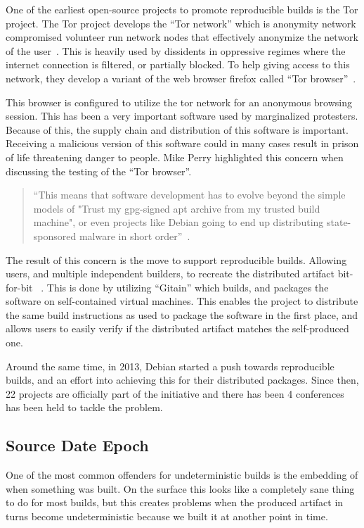 \documentclass[../Main/thesis.tex]{subfiles}
\begin{document}
One of the earliest open-source projects to promote reproducible builds is the
Tor project. The Tor project develops the ``Tor network'' which is anonymity
network compromised volunteer run network nodes that effectively anonymize the
network of the user~\cite{tor}. This is heavily used by dissidents in oppressive regimes
where the internet connection is filtered, or partially blocked. To help giving
access to this network, they develop a variant of the web browser firefox called
``Tor browser''~\cite{tor-browser}.


This browser is configured to utilize the tor network for an anonymous browsing
session. This has been a very important software used by marginalized
protesters. Because of this, the supply chain and distribution of this software
is important. Receiving a malicious version of this software could in many cases
result in prison of life threatening danger to people. Mike Perry highlighted
this concern when discussing the testing of the ``Tor browser''.

\begin{quotation}
``This means that software development has to evolve beyond the simple models of
"Trust my gpg-signed apt archive from my trusted build machine", or even
projects like Debian going to end up distributing state-sponsored malware in
short order''~\cite{mike-perry-2013}.
\end{quotation}


The result of this concern is the move to support reproducible builds. Allowing
users, and multiple independent builders, to recreate the distributed artifact
bit-for-bit ~\cite{unknown-2014}. This is done by utilizing ``Gitain'' which
builds, and packages the software on self-contained virtual machines. This
enables the project to distribute the same build instructions as used to package
the software in the first place, and allows users to easily verify if the
distributed artifact matches the self-produced one.


Around the same time, in 2013, Debian started a push towards reproducible
builds, and an effort into achieving this for their distributed packages. Since
then, 22 projects are officially part of the initiative and there has been 4
conferences has been held to tackle the problem.

\subsection*{Source Date Epoch}
One of the most common offenders for undeterministic builds is the embedding of
when something was built. On the surface this looks like a completely sane thing
to do for most builds, but this creates problems when the produced artifact in
turns become undeterministic because we built it at another point in time.
\end{document}
